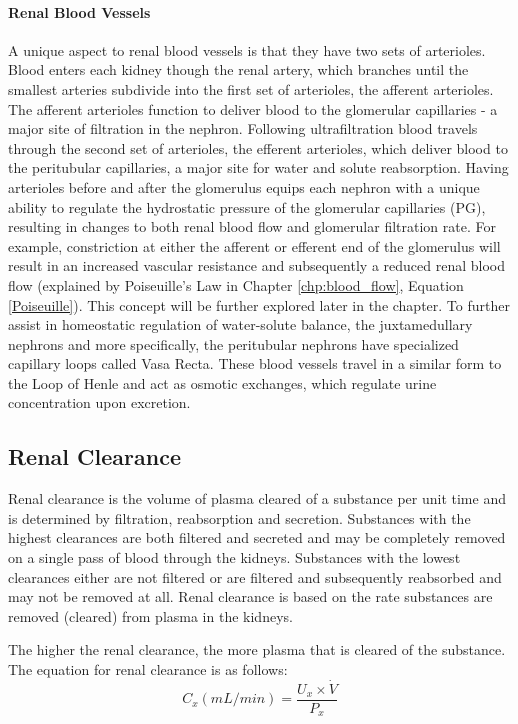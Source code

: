 \paragraph{Renal Blood Vessels}
A unique aspect to renal blood vessels is that they have two sets of arterioles. Blood enters each kidney though the renal artery, which branches until the smallest arteries subdivide into the first set of arterioles, the afferent arterioles. The afferent arterioles function to deliver blood to the glomerular capillaries - a major site of filtration in the nephron. Following ultrafiltration blood travels through the second set of arterioles, the efferent arterioles, which deliver blood to the peritubular capillaries, a major site for water and solute reabsorption. Having arterioles before and after the glomerulus equips each nephron with a unique ability to regulate the hydrostatic pressure of the glomerular capillaries (PG), resulting in changes to both renal blood flow and glomerular filtration rate. For example, constriction at either the afferent or efferent end of the glomerulus will result in an increased vascular resistance and subsequently a reduced renal blood flow (explained by Poiseuille’s Law in Chapter \ref{chp:blood_flow}, Equation \ref{Poiseuille}). This concept will be further explored later in the chapter. 
To further assist in homeostatic regulation of water-solute balance, the juxtamedullary nephrons and more specifically, the peritubular nephrons have specialized capillary loops called Vasa Recta. These blood vessels travel in a similar form to the Loop of Henle and act as osmotic exchanges, which regulate urine concentration upon excretion. 


\subsection{Renal Clearance}

Renal clearance is the volume of plasma cleared of a substance per unit time and is determined by filtration, reabsorption and secretion. Substances with the highest clearances are both filtered and secreted and may be completely removed on a single pass of blood through the kidneys. Substances with the lowest clearances either are not filtered or are filtered and subsequently reabsorbed and may not be removed at all.  Renal clearance is based on the rate substances are removed (cleared) from plasma in the kidneys.

The higher the renal clearance, the more plasma that is cleared of the substance. The equation for renal clearance is as follows:
\vspace{4mm}
\begin{equation}
    C_x (mL/min) = \frac{U_x \times \dot{V}}{P_x}
    \label{renal_clearance}
\end{equation}

